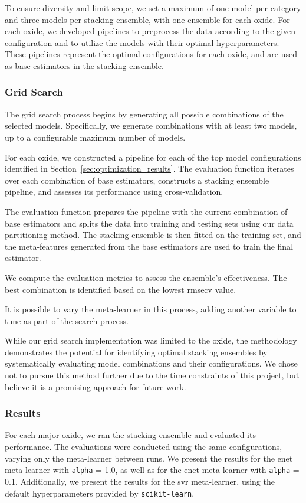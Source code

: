 To ensure diversity and limit scope, we set a maximum of one model per category and three models per stacking ensemble, with one ensemble for each oxide.
For each oxide, we developed pipelines to preprocess the data according to the given configuration and to utilize the models with their optimal hyperparameters.
These pipelines represent the optimal configurations for each oxide, and are used as base estimators in the stacking ensemble.

\subsubsection{Grid Search}\label{subsec:grid_search}
The grid search process begins by generating all possible combinations of the selected models.
Specifically, we generate combinations with at least two models, up to a configurable maximum number of models.

For each oxide, we constructed a pipeline for each of the top model configurations identified in Section~\ref{sec:optimization_results}.
The evaluation function iterates over each combination of base estimators, constructs a stacking ensemble pipeline, and assesses its performance using cross-validation.

The evaluation function prepares the pipeline with the current combination of base estimators and splits the data into training and testing sets using our data partitioning method.
The stacking ensemble is then fitted on the training set, and the meta-features generated from the base estimators are used to train the final estimator.

We compute the evaluation metrics to assess the ensemble's effectiveness.
The best combination is identified based on the lowest \gls{rmsecv} value.

It is possible to vary the meta-learner in this process, adding another variable to tune as part of the search process.

While our grid search implementation was limited to the  oxide, the methodology demonstrates the potential for identifying optimal stacking ensembles by systematically evaluating model combinations and their configurations.
We chose not to pursue this method further due to the time constraints of this project, but believe it is a promising approach for future work.


\subsubsection{Results}\label{subsec:stacking_ensemble_results}
For each major oxide, we ran the stacking ensemble and evaluated its performance.
The evaluations were conducted using the same configurations, varying only the meta-learner between runs.
We present the results for the \gls{enet} meta-learner with \texttt{alpha} = 1.0, as well as for the \gls{enet} meta-learner with \texttt{alpha} = 0.1.
Additionally, we present the results for the \gls{svr} meta-learner, using the default hyperparameters provided by \texttt{scikit-learn}.

